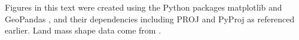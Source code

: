 \documentclass[]{interact}
\begin{document}
Figures in this text were created using the Python packages matplotlib
\citep{matplotlib} and GeoPandas \citep{geopandas}, and their dependencies
including PROJ \citep{proj} and PyProj \citep{pyproj} as referenced earlier.
Land mass shape data come from \citet{natearth}.





\end{document}
